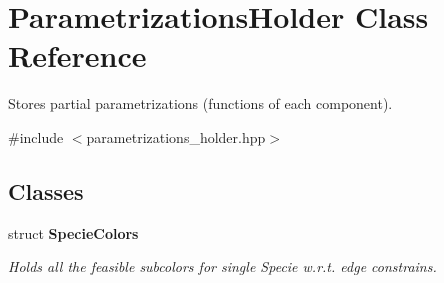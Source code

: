 \hypertarget{classParametrizationsHolder}{\section{\-Parametrizations\-Holder \-Class \-Reference}
\label{classParametrizationsHolder}
}


\-Stores partial parametrizations (functions of each component).  




{\ttfamily \#include $<$parametrizations\-\_\-holder.\-hpp$>$}

\subsection*{\-Classes}
\begin{DoxyCompactItemize}
\item 
struct {\bfseries \-Specie\-Colors}
\begin{DoxyCompactList}\small\item\em \-Holds all the feasible subcolors for single \-Specie w.\-r.\-t. edge constrains. \end{DoxyCompactList}\end{DoxyCompactItemize}
